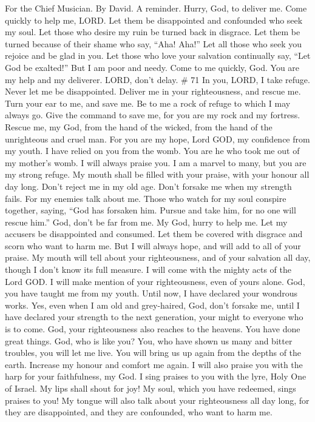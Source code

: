 For the Chief Musician. By David. A reminder.  Hurry, God,
to deliver me. Come quickly to help me, LORD.  Let them be
disappointed and confounded who seek my soul. Let those who desire my
ruin be turned back in disgrace.  Let them be turned
because of their shame who say, ``Aha! Aha!''  Let all
those who seek you rejoice and be glad in you. Let those who love your
salvation continually say, ``Let God be exalted!''  But I
am poor and needy. Come to me quickly, God. You are my help and my
deliverer. LORD, don't delay. \# 71  In you, LORD, I take
refuge. Never let me be disappointed.  Deliver me in your
righteousness, and rescue me. Turn your ear to me, and save me.
 Be to me a rock of refuge to which I may always go. Give
the command to save me, for you are my rock and my fortress.
 Rescue me, my God, from the hand of the wicked, from the
hand of the unrighteous and cruel man.  For you are my
hope, Lord GOD, my confidence from my youth.  I have
relied on you from the womb. You are he who took me out of my mother's
womb. I will always praise you.  I am a marvel to many,
but you are my strong refuge.  My mouth shall be filled
with your praise, with your honour all day long.  Don't
reject me in my old age. Don't forsake me when my strength fails.
 For my enemies talk about me. Those who watch for my
soul conspire together,  saying, ``God has forsaken him.
Pursue and take him, for no one will rescue him.''  God,
don't be far from me. My God, hurry to help me.  Let my
accusers be disappointed and consumed. Let them be covered with disgrace
and scorn who want to harm me.  But I will always hope,
and will add to all of your praise.  My mouth will tell
about your righteousness, and of your salvation all day, though I don't
know its full measure.  I will come with the mighty acts
of the Lord GOD. I will make mention of your righteousness, even of
yours alone.  God, you have taught me from my youth.
Until now, I have declared your wondrous works.  Yes,
even when I am old and grey-haired, God, don't forsake me, until I have
declared your strength to the next generation, your might to everyone
who is to come.  God, your righteousness also reaches to
the heavens. You have done great things. God, who is like you?
 You, who have shown us many and bitter troubles, you
will let me live. You will bring us up again from the depths of the
earth.  Increase my honour and comfort me again.
 I will also praise you with the harp for your
faithfulness, my God. I sing praises to you with the lyre, Holy One of
Israel.  My lips shall shout for joy! My soul, which you
have redeemed, sings praises to you!  My tongue will also
talk about your righteousness all day long, for they are disappointed,
and they are confounded, who want to harm me.

